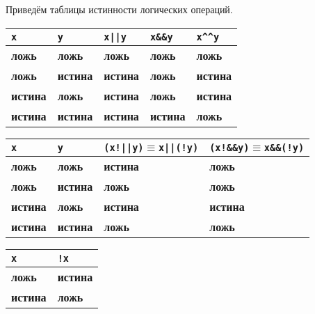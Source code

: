 \documentclass[10pt]{report}
\begin{document}
Приведём таблицы истинности логических операций.
\begin{center}
	\vspace{5mm}
	\begin{longtable}{|l|l|l|l|l|}  \hline
		\texttt{x}          & \texttt{y}        & \texttt{x||y}     & \texttt{x\&\&y}   & \texttt{x\^{ }\^{ }y} \\  \hline
		\textbf{ложь}       & \textbf{ложь}     & \textbf{ложь}     & \textbf{ложь}     & \textbf{ложь}         \\  \hline
		\textbf{ложь}       & \textbf{истина}   & \textbf{истина}   & \textbf{ложь}     & \textbf{истина}       \\  \hline
		\textbf{истина}     & \textbf{ложь}     & \textbf{истина}   & \textbf{ложь}     & \textbf{истина}       \\  \hline
		\textbf{истина}     & \textbf{истина}   & \textbf{истина}   & \textbf{истина}   & \textbf{ложь}         \\  \hline
	\end{longtable}
	
	\begin{longtable}{|l|l|l|l|}  \hline
		\texttt{x}          & \texttt{y}        & \texttt{(x!||y)$\equiv$x||(!y)}   & \texttt{(x!\&\&y)$\equiv$x\&\&(!y)}   \\  \hline
		\textbf{ложь}       & \textbf{ложь}     & \textbf{истина}                   & \textbf{ложь}                         \\  \hline
		\textbf{ложь}       & \textbf{истина}   & \textbf{ложь}                     & \textbf{ложь}                         \\  \hline
		\textbf{истина}     & \textbf{ложь}     & \textbf{истина}                   & \textbf{истина}                       \\  \hline
		\textbf{истина}     & \textbf{истина}   & \textbf{ложь}                     & \textbf{ложь}                         \\  \hline
	\end{longtable}
	
	
	\begin{longtable}{|l|l|}  \hline
		\texttt{x}         & \texttt{!x}       \\  \hline
		\textbf{ложь}       & \textbf{истина}   \\  \hline
		\textbf{истина}     & \textbf{ложь}     \\  \hline
	\end{longtable}
\end{center}
\end{document}
